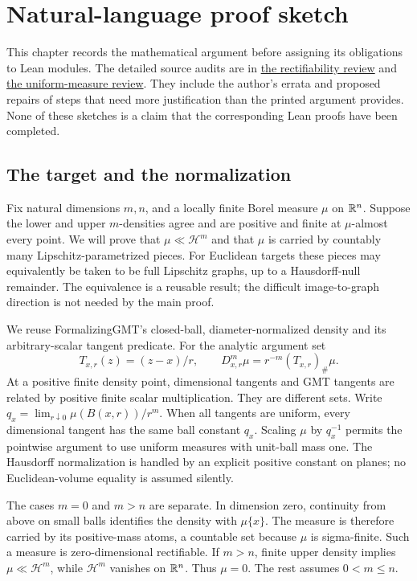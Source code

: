 \chapter{Natural-language proof sketch}
\label{chap:proof-sketch}

This chapter records the mathematical argument before assigning its obligations
to Lean modules. The detailed source audits are in
\href{https://github.com/tdwag123/PreissFormalization/blob/main/blueprint/reviews/rectifiability-audit.tex}{the rectifiability review}
and
\href{https://github.com/tdwag123/PreissFormalization/blob/main/blueprint/reviews/preiss-proof-audit.tex}{the uniform-measure review}.
They include the author's errata and proposed repairs of steps that need more
justification than the printed argument provides. None of these sketches is a
claim that the corresponding Lean proofs have been completed.

\section{The target and the normalization}
Fix natural dimensions $m,n$, and a locally finite Borel measure $\mu$ on
$\mathbb R^n$. Suppose the lower and upper $m$-densities agree and are positive and
finite at $\mu$-almost every point. We will prove that $\mu\ll\mathcal H^m$
and that $\mu$ is carried by countably many Lipschitz-parametrized pieces.
For Euclidean targets these pieces may equivalently be taken to be full
Lipschitz graphs, up to a Hausdorff-null remainder. The equivalence is a reusable
result; the difficult image-to-graph direction is not needed by the main proof.

We reuse FormalizingGMT's closed-ball, diameter-normalized density and its
arbitrary-scalar tangent predicate. For the analytic argument set
\[
 T_{x,r}(z)=(z-x)/r,\qquad D^m_{x,r}\mu=r^{-m}(T_{x,r})_\#\mu.
\]
At a positive finite density point, dimensional tangents and GMT tangents
are related by positive finite scalar multiplication. They are different sets.
Write $q_x=\lim_{r\downarrow0}\mu(B(x,r))/r^m$. When all tangents are uniform,
every dimensional tangent has the same ball constant $q_x$. Scaling $\mu$
by $q_x^{-1}$ permits the pointwise argument to use uniform measures with
unit-ball mass one. The Hausdorff normalization is handled by an explicit
positive constant on planes; no Euclidean-volume equality is assumed silently.

The cases $m=0$ and $m>n$ are separate. In dimension zero, continuity from
above on small balls identifies the density with $\mu\{x\}$. The measure is
therefore carried by its positive-mass atoms, a countable set because $\mu$
is sigma-finite. Such a measure is zero-dimensional rectifiable. If $m>n$,
finite upper density implies $\mu\ll\mathcal H^m$, while $\mathcal H^m$
vanishes on $\mathbb R^n$. Thus $\mu=0$. The rest assumes $0<m\leq n$.

